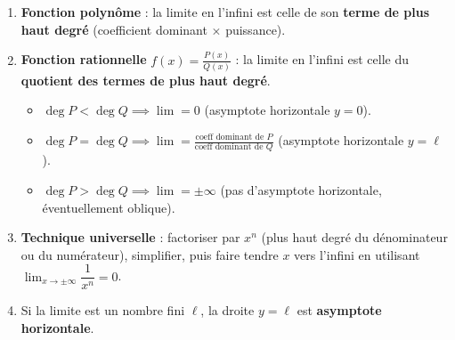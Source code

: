 \documentclass[11pt]{article}
\begin{document}
\begin{methode}
\begin{enumerate}
\item \textbf{Fonction polynôme} : la limite en l'infini est celle de son \textbf{terme de plus haut degré} (coefficient dominant $\times$ puissance).
\item \textbf{Fonction rationnelle} $f(x)=\frac{P(x)}{Q(x)}$ : la limite en l'infini est celle du \textbf{quotient des termes de plus haut degré}.
  \begin{itemize}
  \item $\deg P < \deg Q \implies \lim = 0$ (asymptote horizontale $y=0$).
  \item $\deg P = \deg Q \implies \lim = \frac{\text{coeff dominant de }P}{\text{coeff dominant de }Q}$ (asymptote horizontale $y=\ell$).
  \item $\deg P > \deg Q \implies \lim = \pm\infty$ (pas d'asymptote horizontale, éventuellement oblique).
  \end{itemize}
\item \textbf{Technique universelle} : factoriser par $x^{n}$ (plus haut degré du dénominateur ou du numérateur), simplifier, puis faire tendre $x$ vers l'infini en utilisant $\lim_{x\to\pm\infty}\dfrac{1}{x^{n}}=0$.
\item Si la limite est un nombre fini $\ell$, la droite $y=\ell$ est \textbf{asymptote horizontale}.
\end{enumerate}
\end{methode}
\end{document}
